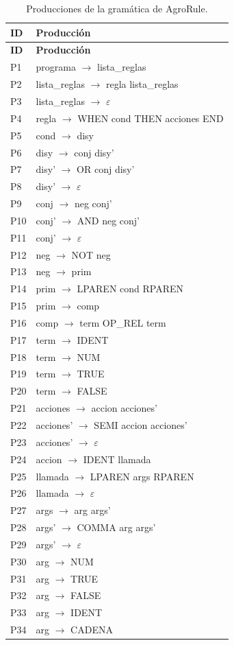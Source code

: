 {\small\begin{longtable}{L{1.1cm}L{12.2cm}}
\caption{Producciones de la gramática de AgroRule.}\label{tab:producciones}\\
\toprule\textbf{ID}&\textbf{Producción}\\\midrule\endfirsthead
\toprule\textbf{ID}&\textbf{Producción}\\\midrule\endhead
P1&programa $\rightarrow$ lista\_reglas\\
P2&lista\_reglas $\rightarrow$ regla lista\_reglas\\
P3&lista\_reglas $\rightarrow$ $\varepsilon$\\
P4&regla $\rightarrow$ WHEN cond THEN acciones END\\
P5&cond $\rightarrow$ disy\\
P6&disy $\rightarrow$ conj disy'\\
P7&disy' $\rightarrow$ OR conj disy'\\
P8&disy' $\rightarrow$ $\varepsilon$\\
P9&conj $\rightarrow$ neg conj'\\
P10&conj' $\rightarrow$ AND neg conj'\\
P11&conj' $\rightarrow$ $\varepsilon$\\
P12&neg $\rightarrow$ NOT neg\\
P13&neg $\rightarrow$ prim\\
P14&prim $\rightarrow$ LPAREN cond RPAREN\\
P15&prim $\rightarrow$ comp\\
P16&comp $\rightarrow$ term OP\_REL term\\
P17&term $\rightarrow$ IDENT\\
P18&term $\rightarrow$ NUM\\
P19&term $\rightarrow$ TRUE\\
P20&term $\rightarrow$ FALSE\\
P21&acciones $\rightarrow$ accion acciones'\\
P22&acciones' $\rightarrow$ SEMI accion acciones'\\
P23&acciones' $\rightarrow$ $\varepsilon$\\
P24&accion $\rightarrow$ IDENT llamada\\
P25&llamada $\rightarrow$ LPAREN args RPAREN\\
P26&llamada $\rightarrow$ $\varepsilon$\\
P27&args $\rightarrow$ arg args'\\
P28&args' $\rightarrow$ COMMA arg args'\\
P29&args' $\rightarrow$ $\varepsilon$\\
P30&arg $\rightarrow$ NUM\\
P31&arg $\rightarrow$ TRUE\\
P32&arg $\rightarrow$ FALSE\\
P33&arg $\rightarrow$ IDENT\\
P34&arg $\rightarrow$ CADENA\\
\bottomrule\end{longtable}}
